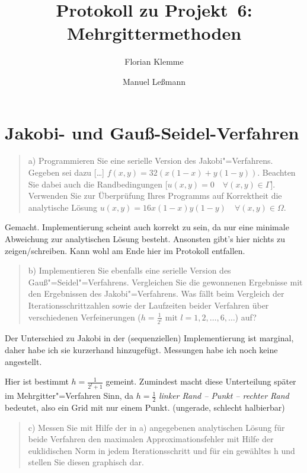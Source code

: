 \documentclass[paper = a4]{scrartcl}
\begin{document}
\subject{Praktikum Multicore"=Programmierung}
\title{Protokoll zu Projekt~6: Mehrgittermethoden}
\author{Florian Klemme \and Manuel Leßmann}
\maketitle

\section{Jakobi- und Gauß-Seidel-Verfahren}

\begin{quote}
    a) Programmieren Sie eine serielle Version des Jakobi"=Verfahrens. Gegeben sei dazu [\dots] \(f(x, y) = 32(x(1 - x) + y(1 - y))\). Beachten Sie dabei auch die Randbedingungen [\(u(x, y) = 0 \quad \forall (x, y) \in \Gamma\)]. Verwenden Sie zur Überprüfung Ihres Programms auf Korrektheit die analytische Lösung \(u(x, y) = 16x(1 - x)y(1 - y) \quad \forall (x, y) \in \Omega\).
\end{quote}

Gemacht. Implementierung scheint auch korrekt zu sein, da nur eine minimale Abweichung zur analytischen Lösung besteht. Ansonsten gibt's hier nichts zu zeigen/schreiben. Kann wohl am Ende hier im Protokoll entfallen.

\begin{quote}
    b) Implementieren Sie ebenfalls eine serielle Version des Gauß"=Seidel"=Verfahrens. Vergleichen Sie die gewonnenen Ergebnisse mit den Ergebnissen des Jakobi"=Verfahrens. Was fällt beim Vergleich der Iterationsschrittzahlen sowie der Laufzeiten beider Verfahren über verschiedenen Verfeinerungen (\(h = \frac{1}{2^l} \text{ mit } l = 1, 2, \dots, 6, \dots\)) auf?
\end{quote}

Der Unterschied zu Jakobi in der (sequenziellen) Implementierung ist marginal, daher habe ich sie kurzerhand hinzugefügt. Messungen habe ich noch keine angestellt.

Hier ist bestimmt \(h = \frac{1}{2^{l} + 1}\) gemeint. Zumindest macht diese Unterteilung später im Mehrgitter"=Verfahren Sinn, da \(h = \frac{1}{2}\) \emph{linker Rand -- Punkt -- rechter Rand} bedeutet, also ein Grid mit nur einem Punkt. (ungerade, schlecht halbierbar)

\begin{quote}
    c) Messen Sie mit Hilfe der in a) angegebenen analytischen Lösung für beide Verfahren den maximalen Approximationsfehler mit Hilfe der euklidischen Norm in jedem Iterationsschritt und für ein gewähltes h und stellen Sie diesen graphisch dar.
\end{quote}
\end{document}
